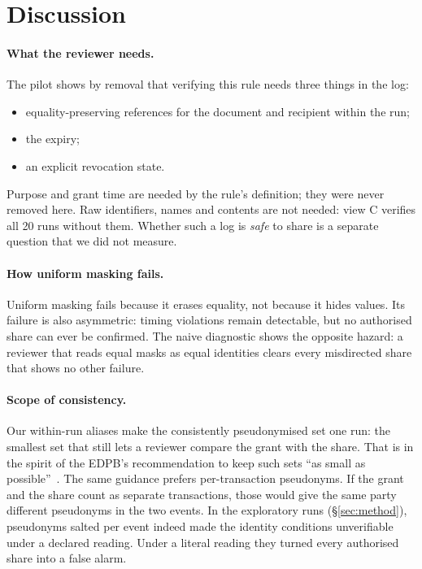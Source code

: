 \documentclass[11pt]{article}
\begin{document}
\section{Discussion}

\paragraph{What the reviewer needs.} The pilot shows by removal that verifying this rule needs three things in the log:
\begin{itemize}
  \item equality-preserving references for the document and recipient within the run;
  \item the expiry;
  \item an explicit revocation state.
\end{itemize}
Purpose and grant time are needed by the rule's definition; they were never removed here. Raw identifiers, names and contents are not needed: view C verifies all 20 runs without them. Whether such a log is \emph{safe} to share is a separate question that we did not measure.

\paragraph{How uniform masking fails.} Uniform masking fails because it erases equality, not because it hides values. Its failure is also asymmetric: timing violations remain detectable, but no authorised share can ever be confirmed. The naive diagnostic shows the opposite hazard: a reviewer that reads equal masks as equal identities clears every misdirected share that shows no other failure.

\paragraph{Scope of consistency.} Our within-run aliases make the consistently pseudonymised set one run: the smallest set that still lets a reviewer compare the grant with the share. That is in the spirit of the EDPB's recommendation to keep such sets ``as small as possible''~\cite{edpb2025pseudo}. The same guidance prefers per-transaction pseudonyms. If the grant and the share count as separate transactions, those would give the same party different pseudonyms in the two events. In the exploratory runs (\S\ref{sec:method}), pseudonyms salted per event indeed made the identity conditions unverifiable under a declared reading. Under a literal reading they turned every authorised share into a false alarm.
\end{document}
